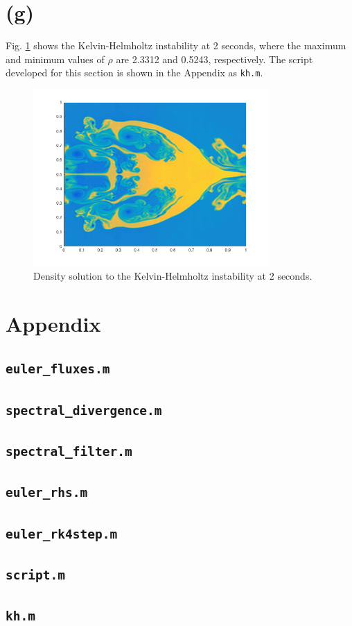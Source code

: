 \documentclass[10pt]{article}
\begin{document}
\section{(g)}
Fig. \ref{fig:kh} shows the Kelvin-Helmholtz instability at 2 seconds, where the maximum and minimum values of \(\rho\) are 2.3312 and 0.5243, respectively. The script developed for this section is shown in the Appendix as {\tt kh.m}.

\begin{figure}[H]
\centering
\includegraphics[width=0.8\textwidth]{figures/kh.png}
\caption{Density solution to the Kelvin-Helmholtz instability at 2 seconds.}
\label{fig:kh}
\end{figure}




\section{Appendix}
\subsection{{\tt euler\_fluxes.m}}

\subsection{{\tt spectral\_divergence.m}}

\subsection{{\tt spectral\_filter.m}}

\subsection{{\tt euler\_rhs.m}}

\subsection{{\tt euler\_rk4step.m}}

\subsection{{\tt script.m}}

\subsection{{\tt kh.m}}

\end{document}
